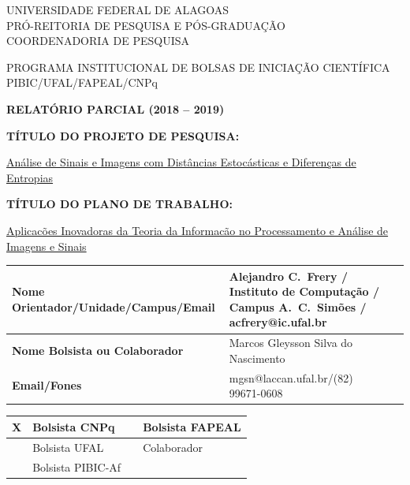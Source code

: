 \documentclass[12pt]{article}
\begin{document}
\thispagestyle{empty}
\begin{center}
\vspace{0.2cm}

\hrulefill

UNIVERSIDADE FEDERAL DE ALAGOAS\\
PRÓ-REITORIA DE PESQUISA E PÓS-GRADUAÇÃO\\
COORDENADORIA DE PESQUISA

\hrulefill

\vspace{0.5cm}

PROGRAMA INSTITUCIONAL DE BOLSAS DE INICIAÇÃO CIENTÍFICA\\PIBIC/UFAL/FAPEAL/CNPq

\vspace{1.0cm}

\textbf{\Large{RELATÓRIO PARCIAL (2018 -- 2019)}}\\

\end{center}

\vspace{1.2cm}

\textbf{TÍTULO DO PROJETO DE PESQUISA:}

\underline{Análise de Sinais e Imagens com Distâncias Estocásticas e Diferenças de Entropias}

\textbf{TÍTULO DO PLANO DE TRABALHO:}

\underline{Aplicacões Inovadoras da Teoria da Informacão no Processamento e Análise de Imagens e Sinais}

\vspace{1cm}

\begin{table}[!h]
\begin{center}
\begin{tabularx}{\textwidth}{|X|X|X|}
\hline                              
\textbf{Nome Orientador/Unidade/Campus/Email} &  Alejandro C.\ Frery / Instituto de Computação / Campus A.\ C.\ Simões / acfrery@ic.ufal.br\\
\hline     
\textbf{Nome Bolsista ou Colaborador} & Marcos Gleysson Silva do Nascimento\\
\hline     
\textbf{Email/Fones} & mgsn@laccan.ufal.br/(82) 99671-0608\\
\hline     
\end{tabularx}
\end{center}
\end{table}

\begin{table}[!h]
\begin{center}
\begin{tabularx}{\textwidth}{|X|X|X|X|}
\hline                              
X & Bolsista CNPq &  & Bolsista FAPEAL\\
\hline             
& Bolsista UFAL &  & Colaborador\\
\hline             
& Bolsista PIBIC-Af &  &\\
\hline     
\end{tabularx}
\end{center}
\end{table}
\end{document}
